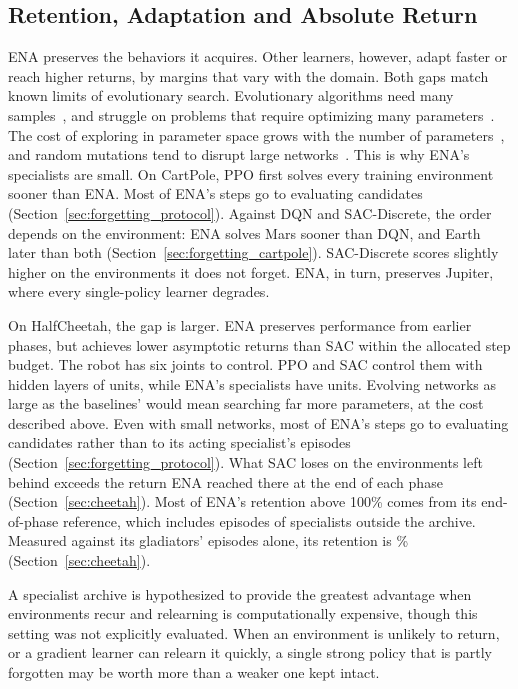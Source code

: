 \subsection{Retention, Adaptation and Absolute Return}
\label{sec:retention}
ENA preserves the behaviors it acquires. Other learners, however, adapt faster or reach higher returns, by margins that vary with the domain. Both gaps match known limits of evolutionary search. Evolutionary algorithms need many samples~\cite{khadka2018evolutionary,pourchot2019cemrl}, and struggle on problems that require optimizing many parameters~\cite{khadka2018evolutionary}. The cost of exploring in parameter space grows with the number of parameters~\cite{vemula2019contrasting}, and random mutations tend to disrupt large networks~\cite{lehman2018safe}. This is why ENA's specialists are small. On CartPole, PPO first solves every training environment sooner than ENA. Most of ENA's steps go to evaluating candidates (Section~\ref{sec:forgetting_protocol}). Against DQN and SAC-Discrete, the order depends on the environment: ENA solves Mars sooner than DQN, and Earth later than both (Section~\ref{sec:forgetting_cartpole}). SAC-Discrete scores slightly higher on the environments it does not forget. ENA, in turn, preserves Jupiter, where every single-policy learner degrades.

On HalfCheetah, the gap is larger. ENA preserves performance from earlier phases, but achieves lower asymptotic returns than SAC within the allocated step budget. The robot has six joints to control. PPO and SAC control them with hidden layers of  units, while ENA's specialists have  units. Evolving networks as large as the baselines' would mean searching far more parameters, at the cost described above. Even with small networks, most of ENA's steps go to evaluating candidates rather than to its acting specialist's episodes (Section~\ref{sec:forgetting_protocol}). What SAC loses on the environments left behind exceeds the return ENA reached there at the end of each phase (Section~\ref{sec:cheetah}). Most of ENA's retention above 100\% comes from its end-of-phase reference, which includes episodes of specialists outside the archive. Measured against its gladiators' episodes alone, its retention is \% (Section~\ref{sec:cheetah}).

A specialist archive is hypothesized to provide the greatest advantage when environments recur and relearning is computationally expensive, though this setting was not explicitly evaluated. When an environment is unlikely to return, or a gradient learner can relearn it quickly, a single strong policy that is partly forgotten may be worth more than a weaker one kept intact.

